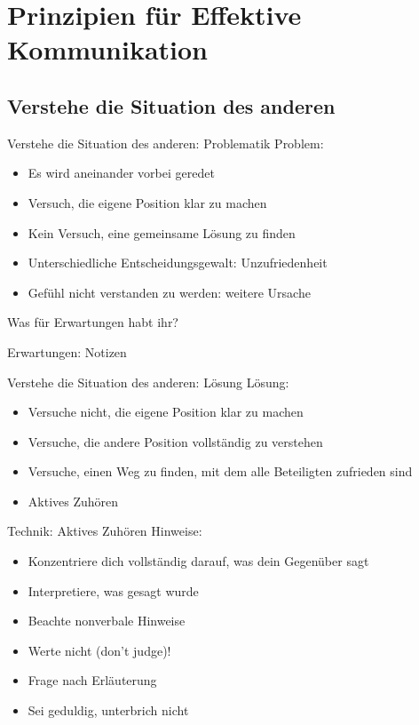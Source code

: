 \section{Prinzipien für Effektive Kommunikation}

\subsection{Verstehe die Situation des anderen}

\begin{frame}[c]{Verstehe die Situation des anderen: Problematik}
    \large
    Problem:
    \begin{itemize}[<+(1)->]
        \item Es wird aneinander vorbei geredet
        \item Versuch, die eigene Position klar zu machen
        \item Kein Versuch, eine gemeinsame Lösung zu finden
        \item Unterschiedliche Entscheidungsgewalt: Unzufriedenheit
        \item Gefühl nicht verstanden zu werden: weitere Ursache
    \end{itemize}
\end{frame}

\begin{frame}[c,standout]
    Was für Erwartungen habt ihr?
\end{frame}

\begin{frame}[c]{Erwartungen: Notizen}
    
\end{frame}

\begin{frame}[c]{Verstehe die Situation des anderen: Lösung}
    \large
    Lösung:
    \begin{itemize}[<+(1)->]
        \item Versuche nicht, die eigene Position klar zu machen
        \item Versuche, die andere Position vollständig zu verstehen
        \item Versuche, einen Weg zu finden, mit dem alle Beteiligten zufrieden sind
        \item Aktives Zuhören
    \end{itemize}
\end{frame}


\begin{frame}[c]{Technik: Aktives Zuhören}
    \large
    Hinweise:
    \begin{itemize}[<+(1)->]
        \item Konzentriere dich vollständig darauf, was dein Gegenüber sagt
        \item Interpretiere, was gesagt wurde
        \item Beachte nonverbale Hinweise
        \item Werte nicht (don't judge)!
        \item Frage nach Erläuterung
        \item Sei geduldig, unterbrich nicht
    \end{itemize}
\end{frame}


